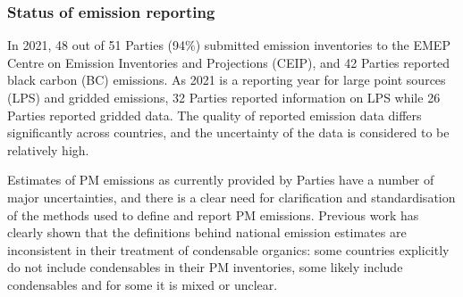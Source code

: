 



\subsubsection*{Status of emission reporting}
In 2021, 48 out of 51 Parties (94$\%$) submitted emission inventories to the EMEP Centre on Emission Inventories and Projections (CEIP), and 42 Parties reported black carbon (BC) emissions. As 2021 is a reporting year for large point sources (LPS) and gridded emissions, 32 Parties reported information on LPS while 26 Parties reported gridded data. The quality of reported emission data differs significantly across countries, and the uncertainty of the data is considered to be relatively high.

Estimates of PM emissions as currently provided by Parties have a number of major uncertainties, and there is a clear need for clarification and standardisation of the methods used to define and report PM emissions. 
Previous work has clearly shown that the definitions behind national emission estimates are inconsistent in their treatment of condensable organics: some countries explicitly do not include condensables in their PM inventories, some likely include condensables and for some it is mixed or unclear.

